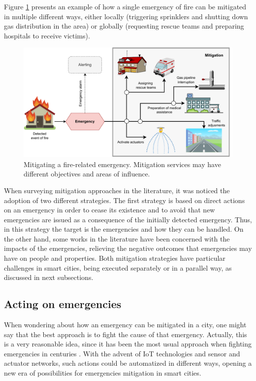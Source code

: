 \begin{refsection}
Figure \ref{Fig:mitigation} presents an example of how a single emergency of fire can be mitigated in multiple different ways, either locally (triggering sprinklers and shutting down gas distribution in the area) or globally (requesting rescue teams and preparing hospitals to receive victims).

\begin{figure}[ht]
\centering
\includegraphics[scale=0.45]{Chapters/1-Survey/images/mitigation.pdf}
\caption{Mitigating a fire-related emergency. Mitigation services may have different objectives and areas of influence.}
\label{Fig:mitigation}
\end{figure}

When surveying mitigation approaches in the literature, it was noticed the adoption of two different strategies. The first strategy is based on direct actions on an emergency in order to cease its existence and to avoid that new emergencies are issued as a consequence of the initially detected emergency. Thus, in this strategy the target is the emergencies and how they can be handled. On the other hand, some works in the literature have been concerned with the impacts of the emergencies, relieving the negative outcomes that emergencies may have on people and properties. Both mitigation strategies have particular challenges in smart cities, being executed separately or in a parallel way, as discussed in next subsections. 

\subsection{Acting on emergencies}

When wondering about how an emergency can be mitigated in a city, one might say that the best approach is to fight the cause of that emergency. Actually, this is a very reasonable idea, since it has been the most usual approach when fighting emergencies in centuries \cite{fireevolution,firetemporaldata1}. With the advent of IoT technologies and sensor and actuator networks, such actions could be automatized in different ways, opening a new era of possibilities for emergencies mitigation in smart cities. 


\end{refsection}
